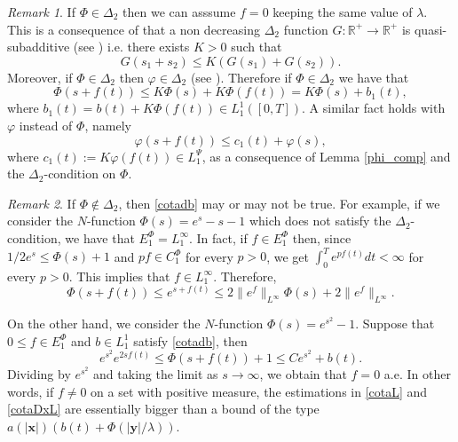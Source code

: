 \documentclass[twoside]{article}
\theoremstyle{remark}
\newtheorem{comentario}{Remark}
\newcommand{\lpsi}{L^{\Psi}}
\newcommand{\ephi}{E^{\Phi}}
\newcommand{\claseor}{C^{\Phi}}
\renewcommand{\b}[1]{\boldsymbol{#1}}
\renewcommand{\leq}{\leqslant}
\begin{document}
  


\begin{comentario} If $\Phi\in\Delta_2$ then we can asssume $f=0$ keeping the same value of $\lambda$. This is a consequence of that a non decreasing $\Delta_2$ function $G:\mathbb{R}^+\to\mathbb{R}^+$ is quasi-subadditive (see \cite[Prop. 4.2]{AF12}) i.e. there exists $K>0$ such that 
\[G(s_1+s_2)\leq K\left(G(s_1)+G(s_2)\right).\]
Moreover, if $\Phi \in \Delta_2$  then $\varphi \in \Delta_2$ (see \cite[Eq. (2.15)]{FZ01}).
Therefore if $\Phi \in \Delta_2$ we have that
\[\Phi\left(s+f(t) \right)\leq K\Phi(s)+
K\Phi\left(f(t) \right)=K\Phi(s)+b_1(t),\]
where $b_1(t)=b(t)+ K\Phi\left(f(t) \right)\in L^1_1([0,T])$. A similar fact holds with $\varphi$ instead of $\Phi$, namely
\[ \varphi\left(s+f(t)\right) \leq c_1(t)+ \varphi\left(s\right),\]
where $c_1(t):=K\varphi\left(f(t)\right)\in \lpsi_1$, as  a consequence of Lemma \ref{phi_comp} and the \linebreak $\Delta_2$-condition on $\Phi$. 
\end{comentario}

\begin{comentario} If $\Phi\notin\Delta_2$, then \eqref{cotadb} may or may not be true.  For example, if we consider the $N$-function $\Phi(s)=e^s-s-1$ which does not satisfy the $\Delta_2$-condition, we have that $\ephi_1=L_1^{\infty}$. In fact, if $f\in \ephi_1$ then,
since $1/2e^s\leq \Phi(s)+1$ and  $pf\in\claseor_1$ for every $p>0$, we get $\int_0^Te^{pf(t)}dt<\infty$ for every $p>0$. This  implies that $f\in L_1^{\infty}$.  Therefore,
\[\Phi(s+f(t))\leq e^{s+f(t)}\leq 2 \|e^f\|_{L^{\infty}}\Phi(s)+2 \|e^f\|_{L^{\infty}}.\] 

On the other hand, we consider  the $N$-function $\Phi(s)=e^{s^2}-1$.  Suppose that $0\leq f\in\ephi_1$ and $b\in L_1^1$ satisfy  \eqref{cotadb}, then
\[e^{s^2}e^{2sf(t)}\leq \Phi(s+f(t))+1\leq Ce^{s^2}+b(t).\]
Dividing by $e^{s^2}$ and taking the limit as $s\to\infty$, we obtain that  $f=0$ a.e. In other words, if $f\neq 0$ on a set with positive measure, the estimations in \eqref{cotaL} and \eqref{cotaDxL} are essentially bigger than a bound of the type  $a(|\b{x}|)\left(b(t)+ \Phi\left(|\b{y}|/\lambda \right)\right)$.
\end{comentario}


%
%
%
%
%
%
\end{document}
